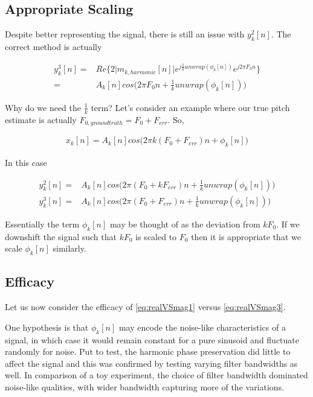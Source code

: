 \documentclass [11pt, proquest] {uwthesis}[2015/03/03]
\begin{document}
\subsection{Appropriate Scaling}

Despite better representing the signal, there is still an issue with $y_k^2[n]$.  The correct method is actually

\begin{align}
\label{eq:realVSmag3}
y_k^3[n] =& Re\{ 2 \vert m_{k,harmonic}[n]  \vert e^{j \frac{1}{k} unwrap(\phi_k[n])} e^{j2\pi F_0 n} \}  \\
=& A_k[n]cos\Big(2\pi F_0 n + \frac{1}{k}unwrap(\phi_k[n])\Big) \nonumber
\end{align}


Why do we need the $\frac{1}{k}$ term?  Let's consider an example where our true pitch estimate is actually $F_{0,ground truth} = F_0 + F_{err}$.  So,

\begin{align}
x_k[n] = A_k[n]cos\Big(2\pi k(F_0 + F_{err})n + \phi_k[n]\Big)
\end{align}

In this case

\begin{align}
y_k^2[n] =& A_k[n]cos\Big(2\pi (F_0 + kF_{err})n + \frac{1}{k}unwrap(\phi_k[n])\Big) \\
y_k^3[n] =& A_k[n]cos\Big(2\pi (F_0 + F_{err})n + \frac{1}{k}unwrap(\phi_k[n])\Big)
\end{align}

Essentially the term $\phi_k[n]$ may be thought of as the deviation from $kF_0$.  If we downshift the signal such that $kF_0$ is scaled to $F_0$ then it is appropriate that we scale $\phi_k[n]$ similarly.

\subsection{Efficacy}

Let us now consider the efficacy of \ref{eq:realVSmag1} versus  \ref{eq:realVSmag3}.

One hypothesis is that $\phi_k[n]$ may encode the noise-like characteristics of a signal, in which case it would remain constant for a pure sinusoid and fluctuate randomly for noise.  Put to test, the harmonic phase preservation did little to affect the signal and this was confirmed by testing varying filter bandwidths as well.  In comparison of a toy experiment, the choice of filter bandwidth dominated noise-like qualities, with wider bandwidth capturing more of the variations.
\end{document}
